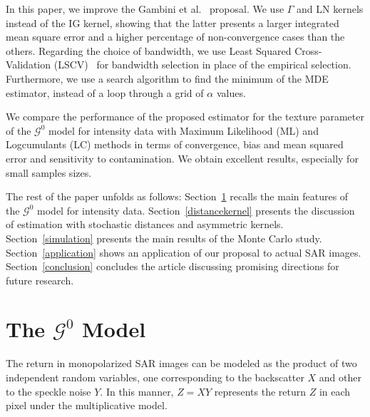 \documentclass[twocolumn]{svjour3}
\begin{document}
In this paper, we improve the Gambini et al.~\cite{gambini2015} proposal. 
We use $\Gamma$ and LN kernels instead of the IG kernel, showing that the latter presents a larger integrated mean square error and a higher percentage of non-convergence cases than the others.
Regarding the choice of bandwidth, we use Least Squared Cross-Validation (LSCV)~\cite{Rudemo1982} for bandwidth selection in place of the empirical selection. 
Furthermore, we use a search algorithm to find the minimum of the MDE estimator, instead of a loop through a grid of $\alpha$ values. 

We compare the performance of the proposed estimator for the texture parameter of the $\mathcal{G}^0$ model for intensity data with Maximum Likelihood (ML) and Logcumulants (LC) methods in terms of convergence, bias and mean squared error and sensitivity to contamination. 
We obtain excellent results, especially for small samples sizes.


The rest of the paper unfolds as follows: 
Section~\ref{sec_SAR} recalls the main features of the $\mathcal{G}^0$ model for intensity data.
Section~\ref{distancekernel} presents the discussion of estimation with stochastic distances and asymmetric kernels. 
Section~\ref{simulation} presents the main results of the Monte Carlo study. Section~\ref{application} shows an application of our proposal to actual SAR images.
Section~\ref{conclusion} concludes the article discussing promising directions for future research.

\section{The $\mathcal{G}^0$ Model}
\label{sec_SAR}

The return in monopolarized SAR images can be modeled as the product of two independent random variables, one corresponding to the backscatter $X$ and other to the speckle noise $Y$. 
In this manner, $Z=X Y  $ represents the return $Z$ in each pixel under the multiplicative model.
\end{document}
